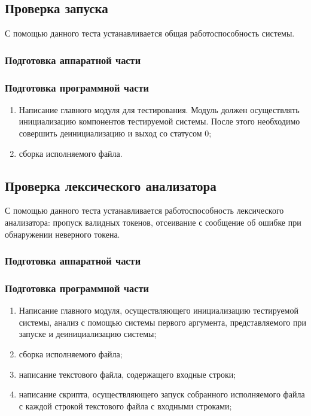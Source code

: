 \documentclass[a4paper, 12pt]{article}
\begin{document}
\subsection{Проверка запуска} %

С помощью данного теста устанавливается общая работоспособность системы.
\subsubsection{Подготовка аппаратной части} %
\subsubsection{Подготовка программной части} %
\begin{enumerate}
	\item Написание главного модуля для тестирования.
		Модуль должен осуществлять инициализацию компонентов 
		тестируемой системы. После этого необходимо совершить
		деинициализацию и выход со статусом 0;
	\item сборка исполняемого файла.
\end{enumerate}


\subsection{Проверка лексического анализатора} %

С помощью данного теста устанавливается работоспособность лексического анализатора: пропуск 
валидных токенов, отсеивание с сообщение об ошибке при обнаружении неверного токена.
\subsubsection{Подготовка аппаратной части} %
\subsubsection{Подготовка программной части} %
\begin{enumerate}
	\item Написание главного модуля, осуществляющего инициализацию
		тестируемой системы, анализ с помощью системы первого аргумента,
		представляемого при запуске и деинициализацию системы;
	\item сборка исполняемого файла;
	\item написание текстового файла, содержащего входные строки;
	\item написание скрипта, осуществляющего запуск собранного исполняемого файла
		с каждой строкой текстового файла с входными строками;
\end{enumerate}
\end{document}
